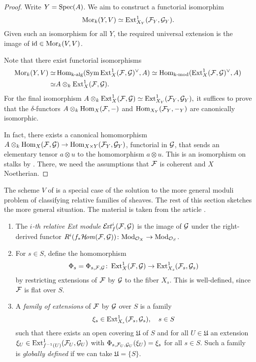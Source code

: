 \begin{proof}
Write $Y=\operatorname{Spec}(A)$. We aim to construct a functorial isomorphim
\[
\operatorname{Mor}_{k}(Y,V)\simeq \operatorname{Ext}^1_{X_Y}(\mathcal{F}_Y, \mathcal{G}_Y).
\]
Given such an isomorphism for all $Y$, the required universal extension is the image of $\operatorname{id}\in\operatorname{Mor}_{k}(V,V)$.

Note that there exist functorial isomorphisms
\begin{align*}
\operatorname{Mor}_{k}(Y,V)
\simeq & \operatorname{Hom}_{\text{k-alg}}(\operatorname{Sym}\operatorname{Ext}^1_X(\mathcal{F},\mathcal{G})^\vee,A) 
\simeq \operatorname{Hom}_{\text{k-mod}}(\operatorname{Ext}^1_X(\mathcal{F},\mathcal{G})^\vee,A) \\
\simeq & A \otimes_k \operatorname{Ext}^1_{X}(\mathcal{F},\mathcal{G}).
\end{align*}
For the final isomorphism
$A \otimes_k \operatorname{Ext}^1_{X}(\mathcal{F},\mathcal{G})\simeq
\operatorname{Ext}^1_{X_Y}(\mathcal{F}_Y,\mathcal{G}_Y),$
it suffices to prove that the $\delta$-functors\footnotemark{} $A\otimes_k \operatorname{Hom}_X(\mathcal{F},-)$ and
$\operatorname{Hom}_{X_Y}(\mathcal{F}_Y, {-}_Y)$ are canonically isomorphic.


In fact, there exists a canonical homomorphism $A\otimes_k \operatorname{Hom}_X(\mathcal{F},\mathcal{G}) \to\operatorname{Hom}_{X\times Y}(\mathcal{F}_Y, {\mathcal{G}}_Y)$, functorial in $\mathcal{G}$, that sends an elementary tensor $a \otimes u$ to the homomorphism $a\otimes u$. This is an isomorphism on stalks by
\cite[Ch.\ \textsc{I}, \S 2.10]{bourbaki-commutative-algebra}.
There, we need the assumptions that $\mathcal{F}$ is coherent and $X$ Noetherian. 
\end{proof}

The scheme $V$ of  is a special case of the solution to the more general moduli problem of classifying relative families of sheaves. The rest of this section sketches the more general situation. The material is taken from the article \cite{lange-universal-extensions}.

\begin{definition}\begin{enumerate}
	\item The \emph{$i$-th relative Ext module} $\mathcal{E}\!\mathit{xt}^i_f(\mathcal{F},\mathcal{G})$ is the image of $\mathcal{G}$ under the right-derived functor
	$R^i(f_{*}\mathcal{H}\!\mathit{om}(\mathcal{F},\mathcal{G}))
	\colon \mathrm{Mod}_{\mathcal{O}_X} \to \mathrm{Mod}_{\mathcal{O}_S}$.

	\item For $s\in S$, define the homomorphism
	\[
		\Phi_s = \Phi_{s,\mathcal{F},\mathcal{G}}
		\colon \operatorname{Ext}^1_X(\mathcal{F},\mathcal{G})
		\to \operatorname{Ext}^1_{X_s}(\mathcal{F}_s, \mathcal{G}_s)
	\]
	by restricting extensions of $\mathcal{F}$ by $\mathcal{G}$ to the fiber $X_s$. This is well-defined, since $\mathcal{F}$ is flat over $S$.

	\item A \emph{family of extensions} of $\mathcal{F}$ by $\mathcal{G}$ over $S$ is a family
	\[
		\xi_s \in \operatorname{Ext}^1_{X_s}(\mathcal{F}_s,\mathcal{G}_s),\quad s\in S
	\]
	such that there exists an open covering $\mathfrak{U}$ of $S$ and for all $U\in \mathfrak{U}$ an extension $\xi_U \in \operatorname{Ext}^1_{f^{-1}(U)}(\mathcal{F}_U,\mathcal{G}_U)$
	with $\Phi_{s,\mathcal{F}_U,\mathcal{G}_U}(\xi_U) = \xi_s$ for all $s\in S$.
	Such a family is \emph{globally defined} if we can take $\mathfrak{U} = \{S\}$.
\end{enumerate}
\end{definition}


